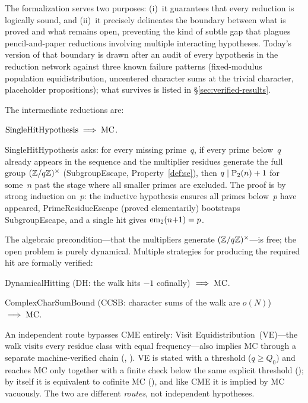 The formalization serves two purposes:
(i)~it guarantees that every reduction is logically sound, and (ii)~it
precisely delineates the boundary between what is proved and what
remains open, preventing the kind of subtle gap that plagues pencil-and-paper
reductions involving multiple interacting hypotheses.  Today's
version of that boundary is drawn after an audit of every hypothesis
in the reduction network against three known failure patterns
(fixed-modulus population equidistribution, uncentered character sums
at the trivial character, placeholder propositions); what survives is
listed in \S\ref{sec:verified-results}.

The intermediate reductions are:

\begin{theorem}
\label{thm:main}
$\mathrm{SingleHitHypothesis} \;\Longrightarrow\; \mathrm{MC}$.
\end{theorem}

SingleHitHypothesis asks: for every missing prime~$q$, if every prime
below~$q$ already appears in the sequence and the multiplier residues
generate the full group $(\mathbb{Z}/q\mathbb{Z})^\times$ (SubgroupEscape,
Property~\ref{def:se}), then $q \mid \mathrm{P}_{2}(n)+1$ for some~$n$ past
the stage where all smaller primes are excluded.  The proof is by strong
induction on~$p$: the inductive hypothesis ensures all primes below~$p$
have appeared, PrimeResidueEscape (proved elementarily) bootstraps
SubgroupEscape, and a single hit gives $\mathrm{em}_{2}(n{+}1) = p$.

The algebraic precondition---that the multipliers generate
$(\mathbb{Z}/q\mathbb{Z})^\times$---is free; the open problem is purely dynamical.
Multiple strategies for producing the required hit are formally verified:

\begin{theorem}
\label{thm:dh-main}
DynamicalHitting (DH: the walk hits $-1$ cofinally)
$\;\Longrightarrow\; \mathrm{MC}$.
\end{theorem}

\begin{theorem}
ComplexCharSumBound (CCSB: character sums of the walk are $o(N)$)
$\;\Longrightarrow\; \mathrm{MC}$.
\end{theorem}

\noindent An independent route bypasses CME entirely:
Visit Equidistribution~(VE)---the walk visits every
residue class with equal frequency---also implies MC through a
separate machine-verified chain
(, ).
VE is stated with a threshold ($q \ge Q_0$) and reaches MC only together
with a finite check below the same explicit threshold
(); by itself it is equivalent to cofinite MC
(), and like CME it is implied by MC
vacuously.  The two are different \emph{routes}, not independent
hypotheses.

